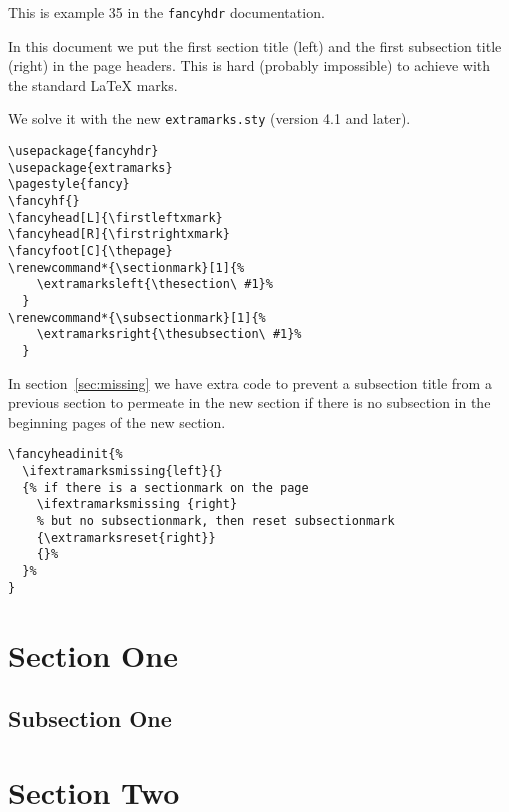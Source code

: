 \documentclass{article}
\renewcommand*{\sectionmark}[1]{\extramarksleft{\thesection\ #1}}
\renewcommand*{\subsectionmark}[1]{\extramarksright{\thesubsection\ #1}}
\begin{document}
\thispagestyle{plain}
\tableofcontents

\bigskip

\noindent
\begin{boxedminipage}{\textwidth}
This is example 35 in the \texttt{fancyhdr} documentation.

In this document we put the first section title (left) and the first subsection title (right) in the page headers. This is hard (probably impossible) to achieve with the standard \LaTeX{} marks.

We solve it with the new \texttt{extramarks.sty} (version 4.1 and later).

\begin{verbatim}
\usepackage{fancyhdr}
\usepackage{extramarks}
\pagestyle{fancy}
\fancyhf{}
\fancyhead[L]{\firstleftxmark}
\fancyhead[R]{\firstrightxmark}
\fancyfoot[C]{\thepage}
\renewcommand*{\sectionmark}[1]{%
    \extramarksleft{\thesection\ #1}%
  }
\renewcommand*{\subsectionmark}[1]{%
    \extramarksright{\thesubsection\ #1}%
  }
\end{verbatim}

In section~\ref{sec:missing} we have extra code to prevent a subsection title from a previous section to permeate in the new section if there is no subsection in the beginning pages of the new section.

\begin{verbatim}
\fancyheadinit{%
  \ifextramarksmissing{left}{}
  {% if there is a sectionmark on the page
    \ifextramarksmissing {right}
    % but no subsectionmark, then reset subsectionmark
    {\extramarksreset{right}}
    {}%
  }%
}
\end{verbatim}
\end{boxedminipage}

\newpage
\pagestyle{fancy}

\section{Section One}

\subsection{Subsection One}

 \lipsum[1-2]

\section{Section Two}
\end{document}
